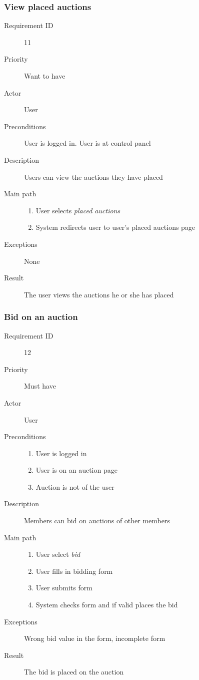 		\subsubsection{View placed auctions}
			\begin{description}
				\item[Requirement ID] 11
				\item[Priority] Want to have
				\item[Actor] User
				\item[Preconditions] User is logged in. User is at control panel
				\item[Description] Users can view the auctions they have placed
				\item[Main path]
 					\begin{enumerate}
						\item User selects \emph{placed auctions}
						\item System redirects user to user's placed auctions page
					\end{enumerate}
				\item[Exceptions] None
				\item[Result] The user views the auctions he or she has placed
			\end{description}
		\subsubsection{Bid on an auction}
			\begin{description}
				\item[Requirement ID] 12
				\item[Priority] Must have
				\item[Actor] User
				\item[Preconditions] 
 					\begin{enumerate}
						\item User is logged in
						\item User is on an auction page
						\item Auction is not of the user
					\end{enumerate}
				\item[Description] Members can bid on auctions of other members
				\item[Main path]
 					\begin{enumerate}
						\item User select \emph{bid}
						\item User fills in bidding form
						\item User submits form
						\item System checks form and if valid places the bid
					\end{enumerate}
				\item[Exceptions] Wrong bid value in the form, incomplete form
				\item[Result] The bid is placed on the auction
			\end{description}
